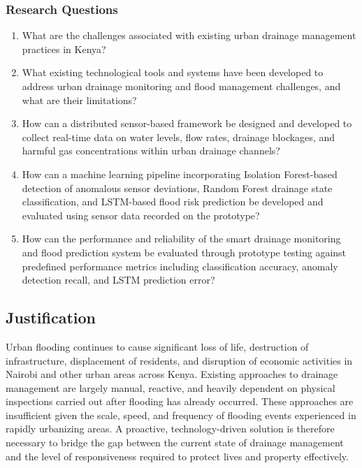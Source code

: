 \documentclass[12pt, a4paper]{article}
\begin{document}
\subsubsection{Research Questions}

\begin{enumerate}[label=\roman*.]

\item What are the challenges associated with existing urban
drainage management practices in Kenya?

\item What existing technological tools and systems have been
developed to address urban drainage monitoring and flood
management challenges, and what are their limitations?

\item How can a distributed sensor-based framework be designed
and developed to collect real-time data on water levels,
flow rates, drainage blockages, and harmful gas
concentrations within urban drainage channels?

\item How can a machine learning pipeline incorporating
Isolation Forest-based detection of anomalous sensor
deviations, Random Forest drainage state classification,
and LSTM-based flood risk prediction be developed and
evaluated using sensor data recorded on the prototype?

\item How can the performance and reliability of the
smart drainage monitoring and flood prediction system be
evaluated through prototype testing against predefined
performance metrics including classification accuracy,
anomaly detection recall, and LSTM prediction error?

\end{enumerate}


\subsection{Justification}

Urban flooding continues to cause significant loss of life, destruction of infrastructure, displacement of residents, and disruption of economic activities in Nairobi and other urban areas across Kenya. Existing approaches to drainage management are largely manual, reactive, and heavily dependent on physical inspections carried out after flooding has already occurred. These approaches are insufficient given the scale, speed, and frequency of flooding events experienced in rapidly urbanizing areas. A proactive, technology-driven solution is therefore necessary to bridge the gap between the current state of drainage management and the level of responsiveness required to protect lives and property effectively.
\end{document}
